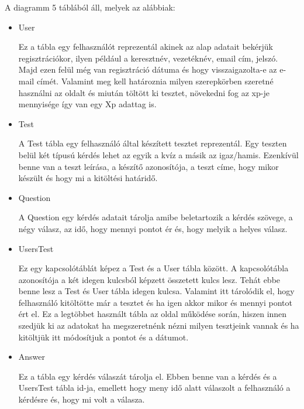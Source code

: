 A diagramm  5 táblából áll, melyek az alábbiak:
\begin{itemize}
    \item {User}
          \begin{addmargin}[\parindent]{0pt}
              Ez a tábla egy felhasználót reprezentál akinek az alap adatait bekérjük regisztrációkor, ilyen például a keresztnév, vezetéknév, email cím, jelszó. Majd ezen felül még van regisztráció dátuma és hogy visszaigazolta-e az e-mail címét. Valamint meg kell határoznia milyen szerepkörben szeretné használni az oldalt és miután töltött ki tesztet, növekedni fog az xp-je mennyisége így van egy Xp adattag is.
          \end{addmargin}

    \item {Test}
          \begin{addmargin}[\parindent]{0pt}
              A Test tábla egy felhasználó által készített tesztet reprezentál. Egy teszten belül két típusú kérdés lehet az egyik a kvíz a másik az igaz/hamis. Ezenkívül benne van a teszt leírása, a készítő azonosítója, a teszt címe, hogy mikor készült és hogy mi a kitöltési határidő.
          \end{addmargin}

    \item {Question}
          \begin{addmargin}[\parindent]{0pt}
              A Question egy kérdés adatait tárolja amibe beletartozik a kérdés szövege, a négy válasz, az idő, hogy mennyi pontot ér és, hogy melyik a helyes válasz.
          \end{addmargin}

    \item {UsersTest}
          \begin{addmargin}[\parindent]{0pt}
              Ez egy kapcsolótáblát képez a Test és a User tábla között. A kapcsolótábla azonosítója a két idegen kulcsból képzett összetett kulcs lesz. Tehát ebbe benne lesz a Test és User tábla idegen kulcsa. Valamint itt tárolódik el, hogy felhasználó kitöltötte már a tesztet és ha igen akkor mikor és mennyi pontot ért el. Ez a legtöbbet használt tábla az oldal működése során, hiszen innen szedjük ki az adatokat ha megszeretnénk nézni milyen tesztjeink vannak és ha kitöltjük itt módosítjuk a pontot és a dátumot.
          \end{addmargin}

    \item {Answer}
          \begin{addmargin}[\parindent]{0pt}
              Ez a tábla egy kérdés válaszát tárolja el. Ebben benne van a kérdés és a UsersTest tábla id-ja, emellett hogy meny idő alatt válaszolt a felhasználó a kérdésre és, hogy mi volt a válasza.
          \end{addmargin}

\end{itemize}

